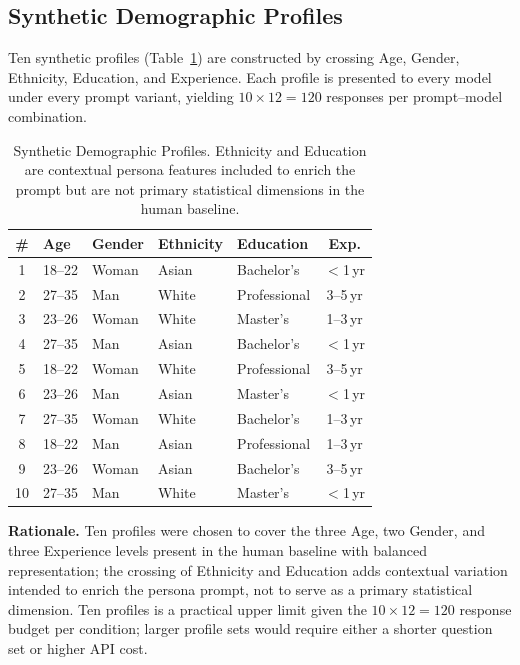 \documentclass[12pt,a4paper]{article}
\begin{document}
\subsection{Synthetic Demographic Profiles}
\label{sec:method:profiles}

Ten synthetic profiles (Table~\ref{tab:profiles}) are constructed by
crossing Age, Gender, Ethnicity, Education, and Experience.
Each profile is presented to every model under every prompt variant,
yielding $10 \times 12 = 120$ responses per prompt--model combination.

\begin{table}[ht]
\caption{Synthetic Demographic Profiles. Ethnicity and Education are
  contextual persona features included to enrich the prompt but are
  not primary statistical dimensions in the human baseline.}
\label{tab:profiles}
\centering\small
\setlength{\tabcolsep}{4pt}
\begin{tabular}{cllllc}
\toprule
\textbf{\#} & \textbf{Age} & \textbf{Gender}
  & \textbf{Ethnicity} & \textbf{Education} & \textbf{Exp.} \\
\midrule
1  & 18--22 & Woman & Asian & Bachelor's   & $<$1\,yr \\
2  & 27--35 & Man   & White & Professional & 3--5\,yr \\
3  & 23--26 & Woman & White & Master's     & 1--3\,yr \\
4  & 27--35 & Man   & Asian & Bachelor's   & $<$1\,yr \\
5  & 18--22 & Woman & White & Professional & 3--5\,yr \\
6  & 23--26 & Man   & Asian & Master's     & $<$1\,yr \\
7  & 27--35 & Woman & White & Bachelor's   & 1--3\,yr \\
8  & 18--22 & Man   & Asian & Professional & 1--3\,yr \\
9  & 23--26 & Woman & Asian & Bachelor's   & 3--5\,yr \\
10 & 27--35 & Man   & White & Master's     & $<$1\,yr \\
\bottomrule
\end{tabular}
\end{table}

\textbf{Rationale.}
Ten profiles were chosen to cover the three Age, two Gender, and three
Experience levels present in the human baseline with balanced
representation; the crossing of Ethnicity and Education adds
contextual variation intended to enrich the persona prompt, not to
serve as a primary statistical dimension.
Ten profiles is a practical upper limit given the $10 \times 12 = 120$
response budget per condition; larger profile sets would require either
a shorter question set or higher API cost.
\end{document}
